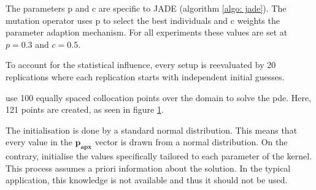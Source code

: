 \documentclass[./\jobname.tex]{subfiles}
\begin{document}
The parameters p and c are specific to JADE (algorithm \ref{algo: jade}). The mutation operator  uses p to select the best individuals and c weights the parameter adaption mechanism. For all experiments these values are set at $p=0.3$ and $c=0.5$. 

To account for the statistical influence, every setup is reevaluated by 20 replications where each replication starts with independent initial guesses. 

\cite{chaquet_using_2019} use 100 equally spaced collocation points over the domain to solve the \gls{pde}. Here, 121 points are created, as seen in figure \ref{fig:collocation_points}. 


\begin{figure}[h]
	\centering
	\noindent{}
	\label{fig:collocation_points}
\end{figure}

The initialisation is done by a standard normal distribution. This means that every value in the $\mathbf{p_{apx}}$ vector is drawn from a normal distribution. On the contrary, \cite{chaquet_using_2019} initialise the values specifically tailored to each parameter of the kernel. This process assumes a priori information about the solution. In the typical application, this knowledge is not available and thus it should not be used. 
\end{document}
